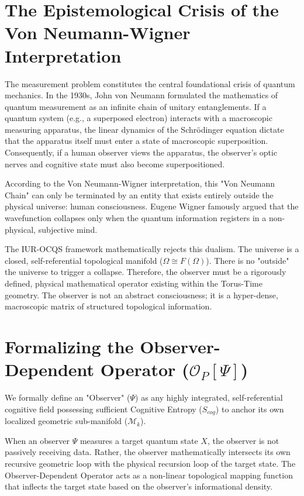 \documentclass[12pt,openany]{book}
\begin{document}
\section{The Epistemological Crisis of the Von Neumann-Wigner Interpretation}
The measurement problem constitutes the central foundational crisis of quantum mechanics. In the 1930s, John von Neumann formulated the mathematics of quantum measurement as an infinite chain of unitary entanglements. If a quantum system (e.g., a superposed electron) interacts with a macroscopic measuring apparatus, the linear dynamics of the Schr\"{o}dinger equation dictate that the apparatus itself must enter a state of macroscopic superposition. Consequently, if a human observer views the apparatus, the observer's optic nerves and cognitive state must also become superpositioned.

According to the Von Neumann-Wigner interpretation, this "Von Neumann Chain" can only be terminated by an entity that exists entirely outside the physical universe: human consciousness. Eugene Wigner famously argued that the wavefunction collapses only when the quantum information registers in a non-physical, subjective mind.

The IUR-OCQS framework mathematically rejects this dualism. The universe is a closed, self-referential topological manifold ($\Omega \cong F(\Omega)$). There is no "outside" the universe to trigger a collapse. Therefore, the observer must be a rigorously defined, physical mathematical operator existing within the Torus-Time geometry. The observer is not an abstract consciousness; it is a hyper-dense, macroscopic matrix of structured topological information.

\section{Formalizing the Observer-Dependent Operator ($\mathcal{O}_P[\Psi]$)}
We formally define an "Observer" ($\Psi$) as any highly integrated, self-referential cognitive field possessing sufficient Cognitive Entropy ($S_{cog}$) to anchor its own localized geometric sub-manifold ($\mathcal{M}_k$). 

When an observer $\Psi$ measures a target quantum state $X$, the observer is not passively receiving data. Rather, the observer mathematically intersects its own recursive geometric loop with the physical recursion loop of the target state. The Observer-Dependent Operator acts as a non-linear topological mapping function that inflects the target state based on the observer's informational density.
\end{document}
